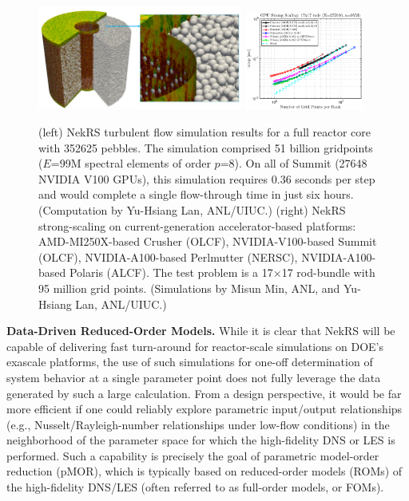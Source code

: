 \begin{figure}[t!] \centering
    \includegraphics[width = 0.60\textwidth]{figs/pbr_pair.png}
    \includegraphics[width = 0.35\textwidth]{figs/nekrs_17x17_crusher_strong.png}
    \caption{(left) NekRS turbulent flow simulation results for a full reactor
core with 352625 pebbles.  The simulation comprised 51 billion gridpoints
($E$=99M spectral elements of order $p$=8).  On all of Summit (27648 NVIDIA
V100 GPUs), this simulation requires 0.36 seconds per step and would complete a
single flow-through time in just six hours. (Computation by Yu-Hsiang Lan,
ANL/UIUC.)
(right) NekRS strong-scaling on current-generation accelerator-based platforms:
AMD-MI250X-based Crusher (OLCF),
NVIDIA-V100-based Summit (OLCF),
NVIDIA-A100-based Perlmutter (NERSC),
NVIDIA-A100-based Polaris (ALCF).
The test problem is a 17$\times$17 rod-bundle with 95 million grid points.
(Simulations by Misun Min, ANL, and Yu-Hsiang Lan, ANL/UIUC.)
\label{fig:pbr}}
\end{figure}


\noindent
{\bf Data-Driven Reduced-Order Models.}
While it is clear that NekRS will be capable of delivering fast turn-around
for reactor-scale simulations on DOE's exascale platforms, the use of 
such simulations for one-off determination of system behavior at a single
parameter point does not fully leverage the data generated by such a large
calculation.
From a design perspective, it would be far more efficient if one could reliably
explore parametric input/output relationships (e.g., Nusselt/Rayleigh-number
relationships under low-flow conditions) in the neighborhood of the parameter
space for which the high-fidelity DNS or LES is performed.   Such a capability
is precisely the goal of parametric model-order reduction (pMOR), which is
typically based on reduced-order models (ROMs) of the high-fidelity DNS/LES
(often referred to as full-order models, or FOMs).   

